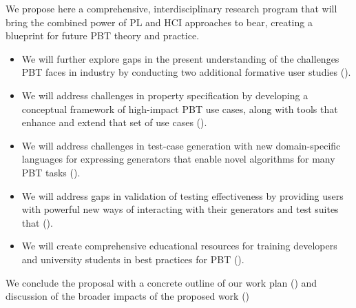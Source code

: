 We propose here a comprehensive, interdisciplinary research program that will
bring the combined power of PL and HCI approaches to bear, creating a
blueprint for future PBT theory and practice.
\iflater{}\fi
\begin{itemize}[noitemsep]
  \item {}We will further explore gaps in the present understanding of the
  challenges PBT faces in
  industry by conducting two\iflater{}\fi{} additional formative user
  studies ().
  \item We will address challenges in property specification by developing a
  conceptual framework of high-impact PBT use cases, along with tools that
  enhance and extend that set of use cases ().
  \item We will address challenges in test-case generation with new
  domain-specific languages for expressing generators that enable novel
  algorithms for many PBT tasks (). 
  \item We will address gaps in validation of testing effectiveness by providing
  users with powerful new ways of interacting with their generators and test
  suites that ().
  \item We will create comprehensive educational resources for training developers and
  university students in best practices for PBT ().
\end{itemize}
We conclude the proposal with a concrete outline of our work plan
() and discussion of the broader impacts of the
proposed work ()

